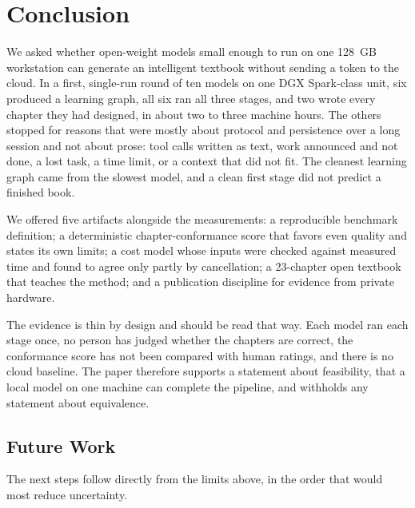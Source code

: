 \section{Conclusion}
\label{sec:conclusion}

We asked whether open-weight models small enough to run on one 128~GB workstation can generate an intelligent textbook without sending a token to the cloud. In a first, single-run round of ten models on one DGX Spark-class unit, six produced a learning graph, all six ran all three stages, and two wrote every chapter they had designed, in about two to three machine hours. The others stopped for reasons that were mostly about protocol and persistence over a long session and not about prose: tool calls written as text, work announced and not done, a lost task, a time limit, or a context that did not fit. The cleanest learning graph came from the slowest model, and a clean first stage did not predict a finished book.

We offered five artifacts alongside the measurements: a reproducible benchmark definition; a deterministic chapter-conformance score that favors even quality and states its own limits; a cost model whose inputs were checked against measured time and found to agree only partly by cancellation; a 23-chapter open textbook that teaches the method; and a publication discipline for evidence from private hardware.

The evidence is thin by design and should be read that way. Each model ran each stage once, no person has judged whether the chapters are correct, the conformance score has not been compared with human ratings, and there is no cloud baseline. The paper therefore supports a statement about feasibility, that a local model on one machine can complete the pipeline, and withholds any statement about equivalence.

\subsection{Future Work}

The next steps follow directly from the limits above, in the order that would most reduce uncertainty.

